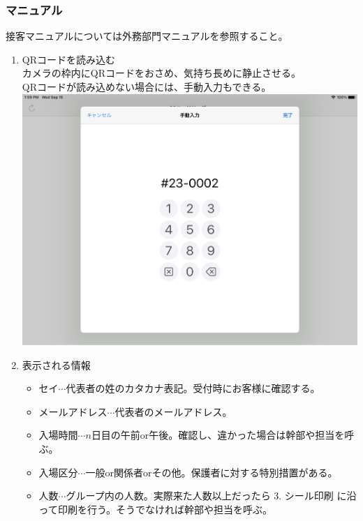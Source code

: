 \documentclass[dvipdfmx,jb5]{jarticle}
\begin{document}
\subsubsection{マニュアル}
 接客マニュアルについては外務部門マニュアルを参照すること。
 \begin{enumerate}
  \item QRコードを読み込む\\
  カメラの枠内にQRコードをおさめ、気持ち長めに静止させる。\\
  QRコードが読み込めない場合には、手動入力もできる。\\
  \includegraphics[scale=0.2]{assets/entrance-system-keypad.png}
  \item 表示される情報
   \begin{itemize}
    \item セイ$\cdots$代表者の姓のカタカナ表記。受付時にお客様に確認する。
    \item メールアドレス$\cdots$代表者のメールアドレス。
    \item 入場時間$\cdots$$n$日目の午前or午後。確認し、違かった場合は幹部や担当を呼ぶ。
    \item 入場区分$\cdots$一般or関係者orその他。保護者に対する特別措置がある。
    \item 人数$\cdots$グループ内の人数。実際来た人数以上だったら 3. シール印刷 に沿って印刷を行う。そうでなければ幹部や担当を呼ぶ。
   \end{itemize}

\end{enumerate}
\end{document}
